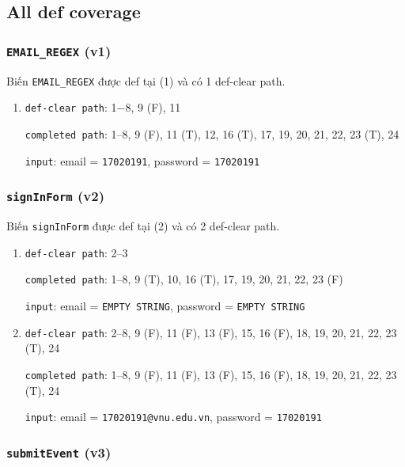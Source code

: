 \documentclass{article}
\begin{document}
\subsection{All def coverage}

\subsubsection*{\texttt{EMAIL\_REGEX} (v1)}

\par Biến \texttt{EMAIL\_REGEX} được def tại (1) và có 1 def-clear path.

\begin{enumerate}
    \item \texttt{def-clear path}: 1$-$8, 9 (F), 11
          \par \texttt{completed path}: 1–8, 9 (F), 11 (T), 12, 16 (T), 17, 19, 20, 21, 22, 23 (T), 24
          \par \texttt{input}: email = \texttt{17020191}, password = \texttt{17020191}
\end{enumerate}

\subsubsection*{\texttt{signInForm} (v2)}

\par Biến \texttt{signInForm} được def tại (2) và có 2 def-clear path.

\begin{enumerate}
    \item \texttt{def-clear path}: 2--3
          \par \texttt{completed path}: 1--8, 9 (T), 10, 16 (T), 17, 19, 20, 21, 22, 23 (F)
          \par \texttt{input}: email = \texttt{EMPTY STRING}, password = \texttt{EMPTY STRING}

    \item \texttt{def-clear path}: 2--8, 9 (F), 11 (F), 13 (F), 15, 16 (F), 18, 19, 20, 21, 22, 23 (T), 24
          \par \texttt{completed path}: 1--8, 9 (F), 11 (F), 13 (F), 15, 16 (F), 18, 19, 20, 21, 22, 23 (T), 24
          \par \texttt{input}: email = \texttt{17020191@vnu.edu.vn}, password = \texttt{17020191}
\end{enumerate}

\subsubsection*{\texttt{submitEvent} (v3)}
\end{document}
